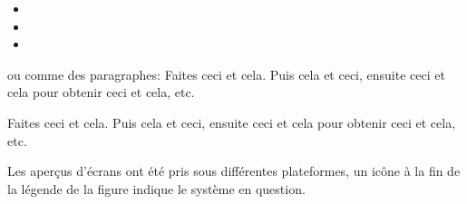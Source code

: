 \begin{itemize}[label=--]
\item {}
\item {}
\item {}
\end{itemize}
ou comme des paragraphes:
\vspace{0.5cm}
\nix{} \osx{} Faites ceci et cela. Puis cela et ceci, ensuite ceci et cela pour obtenir ceci et cela, etc. 
\par
\vspace{0.5cm}
\win{}Faites ceci et cela. Puis cela et ceci, ensuite ceci et cela pour obtenir ceci et cela, etc. 
\par\vspace{0.5cm}
Les aperçus d'écrans ont été pris sous différentes plateformes, un icône à la fin de la légende de la figure indique le système en question.



